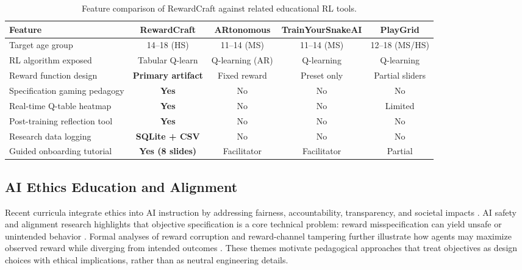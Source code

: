 \documentclass[conference]{IEEEtran}
\begin{document}
\begin{table}[t]
\caption{Feature comparison of RewardCraft against related educational RL tools.}
\label{tab:compare}
\centering
\small
\begin{tabular}{@{}lcccc@{}}
\toprule
\textbf{Feature} & \textbf{RewardCraft} & \textbf{ARtonomous} \cite{dietz2022} & \textbf{TrainYourSnakeAI} \cite{hinojosa2025} & \textbf{PlayGrid} \cite{quiloan2023} \\
\midrule
Target age group              & 14--18 (HS)     & 11--14 (MS)       & 11--14 (MS)       & 12--18 (MS/HS)  \\
RL algorithm exposed          & Tabular Q-learn & Q-learning (AR)   & Q-learning        & Q-learning      \\
Reward function design        & \textbf{Primary artifact} & Fixed reward    & Preset only       & Partial sliders \\
Specification gaming pedagogy & \textbf{Yes}    & No                & No                & No              \\
Real-time Q-table heatmap     & \textbf{Yes}    & No                & No                & Limited         \\
Post-training reflection tool & \textbf{Yes}    & No                & No                & No              \\
Research data logging         & \textbf{SQLite + CSV}& No           & No                & No              \\
Guided onboarding tutorial    & \textbf{Yes (8 slides)} & Facilitator & Facilitator       & Partial         \\
\bottomrule
\end{tabular}
\end{table}

\subsection{AI Ethics Education and Alignment}
Recent curricula integrate ethics into AI instruction by addressing fairness, accountability, transparency, and societal impacts \cite{williams2022}. AI safety and alignment research highlights that objective specification is a core technical problem: reward misspecification can yield unsafe or unintended behavior \cite{amodei2016,krakovna2020}. Formal analyses of reward corruption and reward-channel tampering further illustrate how agents may maximize observed reward while diverging from intended outcomes \cite{everitt2017corr}. These themes motivate pedagogical approaches that treat objectives as design choices with ethical implications, rather than as neutral engineering details.
\end{document}
